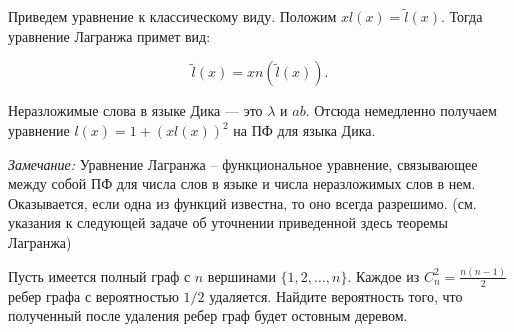 \begin{ordre}
Приведем уравнение к классическому виду. Положим $xl(x)=\tilde{l}(x)$. Тогда уравнение Лагранжа примет вид:

$$\tilde{l}(x)=xn(\tilde{l}(x)).$$



Неразложимые слова в языке Дика --- это $\lambda $ и $ab$. Отсюда немедленно получаем уравнение $l(x)=1+\left(xl(x)\right)^{2} $ на ПФ для языка Дика.

\textit{Замечание:} Уравнение Лагранжа -- функциональное уравнение, связывающее между собой  ПФ для числа слов в языке и числа неразложимых слов в нем. Оказывается, если одна из функций известна, то оно всегда разрешимо. (см.  указания к следующей задаче об уточнении приведенной здесь теоремы Лагранжа)

\end{ordre}


\begin{problem}

Пусть имеется полный граф с $n$ вершинами $\{ 1,2,\ldots ,n\} $. Каждое из $C_n^2=\frac{n(n-1)}{2} $ ребер графа с вероятностью $1/2 $ удаляется. Найдите вероятность того, что полученный после удаления ребер граф будет остовным деревом.

\end{problem}

